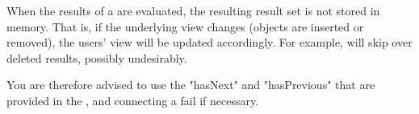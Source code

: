 When the results of a  are evaluated, the resulting result set is not stored in memory. That is, if the underlying view changes (objects are inserted or removed), the users' view will be updated accordingly. For example,  will skip over deleted results, possibly undesirably.

You are therefore advised to use the "hasNext" and "hasPrevious"  that are provided in the , and connecting a fail  if necessary.